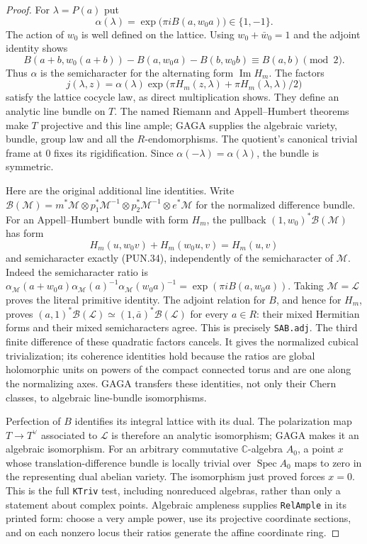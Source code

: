 \begin{proof}
For \(\lambda=P(a)\) put
\[
       \alpha(\lambda)=\exp\bigl(\pi i B(a,w_0a)\bigr)\in\{1,-1\}.
 \tag{PUN.34}
\]
The action of \(w_0\) is well defined on the lattice.  Using
\(w_0+\bar w_0=1\) and the adjoint identity shows
\[
 B(a+b,w_0(a+b))-B(a,w_0a)-B(b,w_0b)
                                  \equiv B(a,b)\pmod2.
\]
Thus \(\alpha\) is the semicharacter for the alternating
form \(\operatorname{Im}H_m\).  The factors
\[
 j(\lambda,z)=\alpha(\lambda)
       \exp\bigl(\pi H_m(z,\lambda)+\pi H_m(\lambda,\lambda)/2\bigr)
 \tag{PUN.35}
\]
satisfy the lattice cocycle law, as direct multiplication
shows.  They define an analytic line bundle on \(T\).
The named Riemann and Appell--Humbert theorems make \(T\)
projective and this line ample; GAGA supplies the algebraic
variety, bundle, group law and all the \(R\)-endomorphisms.
The quotient's canonical trivial frame at \(0\) fixes its
rigidification.  Since \(\alpha(-\lambda)=\alpha(\lambda)\),
the bundle is symmetric.

Here are the original additional line identities.  Write
\(\mathcal B(\mathcal M)=m^*\mathcal M\otimes
p_1^*\mathcal M^{-1}\otimes p_2^*\mathcal M^{-1}\otimes
e^*\mathcal M\) for the normalized difference bundle.
For an Appell--Humbert bundle with form \(H_m\), the pullback
\((1,w_0)^*\mathcal B(\mathcal M)\) has form
\[
 H_m(u,w_0v)+H_m(w_0u,v)=H_m(u,v)
\]
and semicharacter exactly (PUN.34), independently of the
semicharacter of \(\mathcal M\).  Indeed the semicharacter
ratio is
\(\alpha_{\mathcal M}(a+w_0a)\alpha_{\mathcal M}(a)^{-1}
\alpha_{\mathcal M}(w_0a)^{-1}=\exp(\pi iB(a,w_0a))\).
Taking \(\mathcal M=\mathcal L\) proves the literal primitive
identity.  The adjoint relation for \(B\), and hence for
\(H_m\), proves
\((a,1)^*\mathcal B(\mathcal L)
\simeq(1,\bar a)^*\mathcal B(\mathcal L)\) for every
\(a\in R\): their mixed Hermitian forms and their mixed
semicharacters agree.  This is precisely \texttt{SAB.adj}.
The third finite difference of these quadratic factors cancels.
It gives the normalized cubical trivialization; its coherence
identities hold because the ratios are global holomorphic units
on powers of the compact connected torus and are one along the
normalizing axes.  GAGA transfers these identities, not only
their Chern classes, to algebraic line-bundle isomorphisms.

Perfection of \(B\) identifies its integral lattice with its
dual.  The polarization map \(T\to T^\vee\) associated to
\(\mathcal L\) is therefore an analytic isomorphism; GAGA
makes it an algebraic isomorphism.  For an arbitrary commutative
\(\mathbb C\)-algebra \(A_0\), a point \(x\) whose
translation-difference bundle is locally trivial over
\(\operatorname{Spec}A_0\) maps to zero in the representing
dual abelian variety.  The isomorphism just proved forces
\(x=0\).  This is the full \texttt{KTriv} test, including
nonreduced algebras, rather than only a statement about complex
points.  Algebraic ampleness supplies \texttt{RelAmple} in its
printed form: choose a very ample power, use its projective
coordinate sections, and on each nonzero locus their ratios
generate the affine coordinate ring.


\end{proof}
